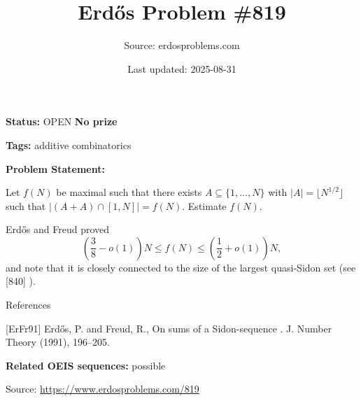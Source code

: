 \documentclass{article}
\title{Erd\H{o}s Problem \#819}
\date{Last updated: 2025-08-31}
\author{Source: erdosproblems.com}
\begin{document}
\maketitle

\noindent\textbf{Status:} OPEN \quad \textbf{No prize}

\noindent\textbf{Tags:} additive combinatorics

\medskip

\noindent\textbf{Problem Statement:}

Let $f(N)$ be maximal such that there exists $A\subseteq \{1,\ldots,N\}$ with $\lvert A\rvert=\lfloor N^{1/2}\rfloor$ such that $\lvert (A+A)\cap [1,N]\rvert=f(N)$. Estimate $f(N)$.




Erd\H{o}s and Freud \cite{ErFr91} proved\[\left(\frac{3}{8}-o(1)\right)N \leq f(N) \leq \left(\frac{1}{2}+o(1)\right)N,\]and note that it is closely connected to the size of the largest quasi-Sidon set (see [840] ).




References

[ErFr91] Erd\H{o}s, P. and Freud, R., On sums of a Sidon-sequence . J. Number Theory (1991), 196--205.

\noindent\textbf{Related OEIS sequences:} possible


\bigskip
\noindent\small{Source: \url{https://www.erdosproblems.com/819}}
\end{document}
